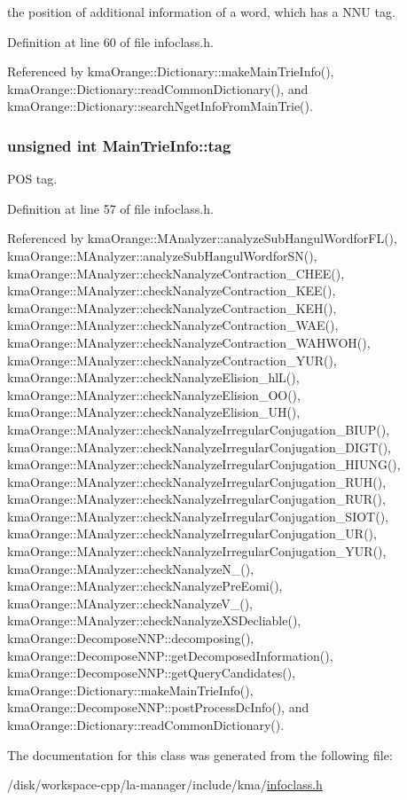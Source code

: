 the position of additional information of a word, which has a NNU tag. 



Definition at line 60 of file infoclass.h.

Referenced by kmaOrange::Dictionary::makeMainTrieInfo(), kmaOrange::Dictionary::readCommonDictionary(), and kmaOrange::Dictionary::searchNgetInfoFromMainTrie().\hypertarget{classMainTrieInfo_58583e1b830e9431567f4dbda01f1f5e}{
\subsubsection[{tag}]{\setlength{\rightskip}{0pt plus 5cm}unsigned int {\bf MainTrieInfo::tag}}}
\label{classMainTrieInfo_58583e1b830e9431567f4dbda01f1f5e}


POS tag. 



Definition at line 57 of file infoclass.h.

Referenced by kmaOrange::MAnalyzer::analyzeSubHangulWordforFL(), kmaOrange::MAnalyzer::analyzeSubHangulWordforSN(), kmaOrange::MAnalyzer::checkNanalyzeContraction\_\-CHEE(), kmaOrange::MAnalyzer::checkNanalyzeContraction\_\-KEE(), kmaOrange::MAnalyzer::checkNanalyzeContraction\_\-KEH(), kmaOrange::MAnalyzer::checkNanalyzeContraction\_\-WAE(), kmaOrange::MAnalyzer::checkNanalyzeContraction\_\-WAHWOH(), kmaOrange::MAnalyzer::checkNanalyzeContraction\_\-YUR(), kmaOrange::MAnalyzer::checkNanalyzeElision\_\-hlL(), kmaOrange::MAnalyzer::checkNanalyzeElision\_\-OO(), kmaOrange::MAnalyzer::checkNanalyzeElision\_\-UH(), kmaOrange::MAnalyzer::checkNanalyzeIrregularConjugation\_\-BIUP(), kmaOrange::MAnalyzer::checkNanalyzeIrregularConjugation\_\-DIGT(), kmaOrange::MAnalyzer::checkNanalyzeIrregularConjugation\_\-HIUNG(), kmaOrange::MAnalyzer::checkNanalyzeIrregularConjugation\_\-RUH(), kmaOrange::MAnalyzer::checkNanalyzeIrregularConjugation\_\-RUR(), kmaOrange::MAnalyzer::checkNanalyzeIrregularConjugation\_\-SIOT(), kmaOrange::MAnalyzer::checkNanalyzeIrregularConjugation\_\-UR(), kmaOrange::MAnalyzer::checkNanalyzeIrregularConjugation\_\-YUR(), kmaOrange::MAnalyzer::checkNanalyzeN\_\-(), kmaOrange::MAnalyzer::checkNanalyzePreEomi(), kmaOrange::MAnalyzer::checkNanalyzeV\_\-(), kmaOrange::MAnalyzer::checkNanalyzeXSDecliable(), kmaOrange::DecomposeNNP::decomposing(), kmaOrange::DecomposeNNP::getDecomposedInformation(), kmaOrange::DecomposeNNP::getQueryCandidates(), kmaOrange::Dictionary::makeMainTrieInfo(), kmaOrange::DecomposeNNP::postProcessDcInfo(), and kmaOrange::Dictionary::readCommonDictionary().

The documentation for this class was generated from the following file:\begin{CompactItemize}
\item 
/disk/workspace-cpp/la-manager/include/kma/\hyperlink{infoclass_8h}{infoclass.h}\end{CompactItemize}
